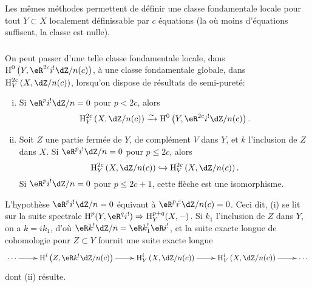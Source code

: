 \subsubsection{}\label{IV:2-2-4}

Les mêmes méthodes permettent de définir une classe fondamentale locale 
pour tout $Y\subset X$ localement définissable par $c$ équations (la où 
moins d'équations suffisent, la classe est nulle). 





\subsubsection{}\label{IV:2-2-5}

On peut passer d'une telle classe fondamentale locale, dans 
$\h^0\left(Y,\eR^{2 c} i^!\dZ/n(c)\right)$, à une classe fondamentale globale, 
dans $\h_Y^{2 c}\left(X,\dZ/n(c)\right)$, lorsqu'on dispose de résultats de 
semi-pureté:





\begin{proposition}\label{IV:2-2-6}
\begin{enumerate}[(i)]
  \item Si $\eR^p i^!\dZ/n=0$ pour $p<2 c$, alors 
    \[
      \h_Y^{2 c}\left(X,\dZ/n(c)\right) \iso \h^0\left(Y,\eR^{2 c} i^! \dZ/n(c)\right) \text{.}
    \]
  \item Soit $Z$ une partie fermée de $Y$, de complément $V$ dans $Y$, et 
    $k$ l'inclusion de $Z$ dans $X$. Si $\eR^p i^! \dZ/n = 0$ pour 
    $p\leqslant 2 c$, alors 
    \[
      \h_Y^{2 c}\left(X,\dZ/n(c)\right) \hookrightarrow \h_V^{2 c}\left(X,\dZ/n(c)\right) \text{.}
    \]
    Si $\eR^p i^!\dZ/n=0$ pour $p\leqslant 2 c+1$, cette flèche est une 
    isomorphisme.
\end{enumerate}
\end{proposition}

L'hypothèse $\eR^p i^!\dZ/n=0$ équivaut à $\eR^p i^!\dZ/n(c)=0$. Ceci dit, 
(i) se lit sur la suite spectrale 
$\h^p(Y,\eR^q i^!)\Rightarrow \h_Y^{p+q}(X,-)$. Si $k_1$ l'inclusion de $Z$ dans 
$Y$, on a $k=i k_1$, d'où $\eR k^! \dZ/n=\eR k_1^! \eR i^!$, et la suite exacte 
longue de cohomologie pour $Z\subset Y$ fournit une suite exacte longue 
\[\xymatrix{
  \cdots \ar[r] 
    & \h^i\left(Z,\eR k^! \dZ/n(c)\right) \ar[r] 
    & \h_Y^i\left(X,\dZ/n(c)\right) \ar[r] 
    & \h_V^i\left(X,\dZ/n(c)\right) \ar[r] 
    & \cdots
}\]
dont (ii) résulte. 





